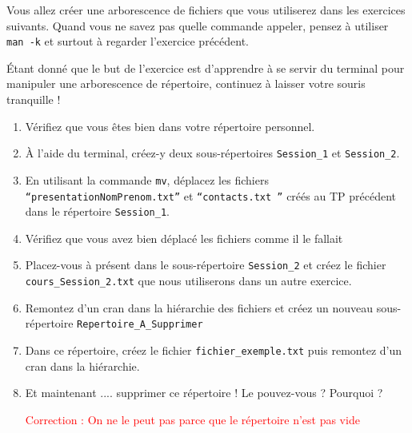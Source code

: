 \documentclass{article}
\begin{document}
Vous allez créer une arborescence de fichiers que vous utiliserez dans les exercices suivants. Quand vous ne savez pas quelle commande appeler, pensez à utiliser \texttt{man\ -k} et surtout à regarder l'exercice précédent.

Étant donné que le but de l'exercice est d'apprendre à se servir du terminal pour
manipuler une arborescence de répertoire, continuez à laisser votre souris tranquille !

\begin{exercice}

\begin{enumerate}
\def\labelenumi{\arabic{enumi}.}
\item 
Vérifiez que vous êtes bien dans votre répertoire personnel.
\item
  À l'aide du terminal, créez-y deux sous-répertoires \texttt{Session\_1} et \texttt{Session\_2}.
\item
  En utilisant la commande \texttt{mv}, déplacez les fichiers 
  \texttt{``presentationNomPrenom.txt''} et \texttt{``contacts.txt ''} créés au TP précédent dans le répertoire \texttt{Session\_1}.
\item
  Vérifiez que vous avez bien déplacé les fichiers comme il le fallait
\item
  Placez-vous à présent dans le sous-répertoire \texttt{Session\_2} et créez le fichier \texttt{cours\_{Session\_2}.txt} que nous utiliserons dans un autre exercice. 
\item
Remontez d'un cran dans la hiérarchie des fichiers et créez un nouveau sous-répertoire \texttt{Repertoire\_{A\_{Supprimer}}}
\item 
Dans ce répertoire, créez le fichier \texttt{fichier\_exemple.txt} puis remontez d'un cran dans la hiérarchie.
\item
Et maintenant .... supprimer ce répertoire ! Le pouvez-vous ? Pourquoi ? 

\textcolor{red}{Correction : On ne le peut pas parce que le répertoire n'est pas vide}

\end{enumerate}

\end{exercice}
\end{document}
